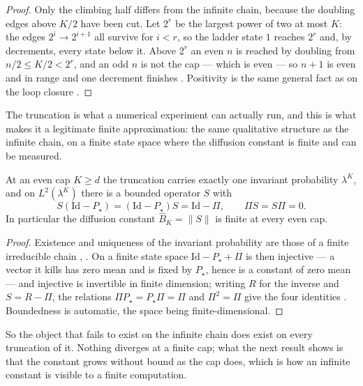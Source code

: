 \begin{proof}
  \leanok
Only the climbing half differs from the infinite chain, because the doubling edges above $K/2$
have been cut. Let $2^{r}$ be the largest power of two at most $K$: the edges
$2^{i}\rightarrow2^{i+1}$ all survive for $i<r$, so the ladder state $1$ reaches $2^{r}$ and,
by decrements, every state below it. Above $2^{r}$ an even $n$ is reached by doubling from
$n/2\leq K/2<2^{r}$, and an odd $n$ is not the cap --- which is even --- so $n+1$ is even and
in range and one decrement finishes . Positivity is the
same general fact as on the loop closure
.
\end{proof}

\noindent The truncation is what a numerical experiment can actually run, and this is what makes it a
legitimate finite approximation: the same qualitative structure as the infinite chain, on a
finite state space where the diffusion constant is finite and can be measured.


\begin{theorem}
  \label{thm:main_truncation_bhat}
  \leanok
At an even cap $K\geq d$ the truncation carries exactly one invariant probability $\lambda^K$,
and on $L^2(\lambda^K)$ there is a bounded operator $S$ with
\[ S(\mathrm{Id}-P_\star)=(\mathrm{Id}-P_\star)S=\mathrm{Id}-\Pi,\qquad \Pi S=S\Pi=0 . \]
In particular the diffusion constant $\widehat B_K=\|S\|$ is finite at every even cap.
\end{theorem}

\begin{proof}
  \leanok
Existence and uniqueness of the invariant probability are those of a finite irreducible chain
, . On a finite state space
$\mathrm{Id}-P_\star+\Pi$ is then injective --- a vector it kills has zero mean and is fixed by
$P_\star$, hence is a constant of zero mean --- and injective is invertible in finite
dimension; writing $R$ for the inverse and $S=R-\Pi$, the relations $\Pi P_\star=P_\star\Pi=\Pi$
and $\Pi^2=\Pi$ give the four identities . Boundedness
is automatic, the space being finite-dimensional.
\end{proof}

\noindent So the object that fails to exist on the infinite chain does exist on every truncation of it.
Nothing diverges at a finite cap; what the next result shows is that the constant grows without
bound as the cap does, which is how an infinite constant is visible to a finite computation.


